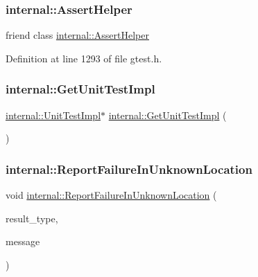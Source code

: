 \subsubsection{\texorpdfstring{internal\+::\+Assert\+Helper}{internal::AssertHelper}}
{\footnotesize\ttfamily friend class \hyperlink{classtesting_1_1internal_1_1AssertHelper}{internal\+::\+Assert\+Helper}\hspace{0.3cm}{\ttfamily [friend]}}



Definition at line 1293 of file gtest.\+h.

\mbox{\label{classtesting_1_1UnitTest_a56e56be7066957d612e53b5c60f6ac08}} 
\subsubsection{\texorpdfstring{internal\+::\+Get\+Unit\+Test\+Impl}{internal::GetUnitTestImpl}}
{\footnotesize\ttfamily \hyperlink{classtesting_1_1internal_1_1UnitTestImpl}{internal\+::\+Unit\+Test\+Impl}$\ast$ \hyperlink{namespacetesting_1_1internal_a9bd0caf5d16512de38b39599c13ee634}{internal\+::\+Get\+Unit\+Test\+Impl} (\begin{DoxyParamCaption}{ }\end{DoxyParamCaption})\hspace{0.3cm}{\ttfamily [friend]}}

\mbox{\label{classtesting_1_1UnitTest_a73f5a158c13793b90c80d854c9a75120}} 
\subsubsection{\texorpdfstring{internal\+::\+Report\+Failure\+In\+Unknown\+Location}{internal::ReportFailureInUnknownLocation}}
{\footnotesize\ttfamily void \hyperlink{namespacetesting_1_1internal_a85f6ff0e40f9a5f10af66a73cf1364fa}{internal\+::\+Report\+Failure\+In\+Unknown\+Location} (\begin{DoxyParamCaption}\item[{\hyperlink{classtesting_1_1TestPartResult_a65ae656b33fdfdfffaf34858778a52d5}{Test\+Part\+Result\+::\+Type}}]{result\+\_\+type,  }\item[{const std\+::string \&}]{message }\end{DoxyParamCaption})\hspace{0.3cm}{\ttfamily [friend]}}

